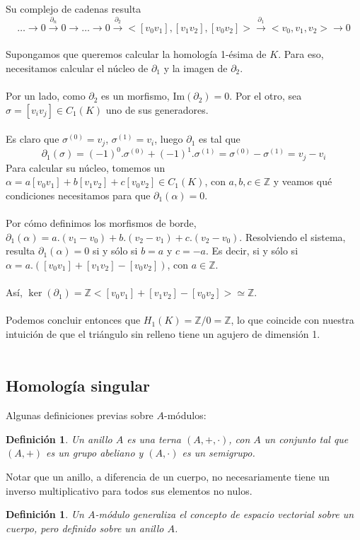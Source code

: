 \documentclass[12pt,a4paper]{article}
\newtheorem{definition}[theorem]{Definición}
\begin{document}
Su complejo de cadenas resulta
\[
    \ldots \rightarrow 0 \xrightarrow{\partial_n} 0 \rightarrow \ldots \rightarrow 0 \xrightarrow{\partial_2} <[v_0 v_1], [v_1v_2], [v_0v_2]> \xrightarrow{\partial_1} <v_0, v_1, v_2> \rightarrow 0
\]
\\
Supongamos que queremos calcular la homología 1-ésima de $K$. Para eso, necesitamos calcular el núcleo de $\partial_1$ y la imagen de $\partial_2$.
\\
\\
Por un lado, como $\partial_2$ es un morfismo, $\text{Im}(\partial_2) = 0$. Por el otro, sea $\sigma = [v_iv_j] \in C_1(K)$ uno de sus generadores.
\\
\\
Es claro que $\sigma^{(0)} = v_j$, $\sigma^{(1)} = v_i$, luego $\partial_1$ es tal que
\[
\partial_1(\sigma) = (-1)^0.\sigma^{(0)} + (-1)^1.\sigma^{(1)} = \sigma^{(0)} - \sigma^{(1)} = v_j - v_i
\]
Para calcular su núcleo, tomemos un $\alpha = a[v_0v_1] + b[v_1v_2] + c[v_0v_2] \in C_1(K)$, con $a, b, c \in \mathbb{Z}$ y veamos qué condiciones necesitamos para que $\partial_1(\alpha) = 0$.
\\
\\
Por cómo definimos los morfismos de borde, $\partial_1(\alpha) = a.(v_1-v_0) + b.(v_2-v_1) + c.(v_2-v_0)$. Resolviendo el sistema, resulta $\partial_1(\alpha)=0$ si y sólo si $b = a$ y $c = -a$. Es decir, si y sólo si $\alpha = a.([v_0v_1] + [v_1v_2] - [v_0v_2])$, con $a \in \mathbb{Z}$.
\\
\\
Así, $\ker(\partial_1)=\mathbb{Z}<[v_0v_1] + [v_1v_2] - [v_0v_2]> \simeq \mathbb{Z}$.
\\
\\
Podemos concluir entonces que $H_1(K) = \mathbb{Z} / 0 = \mathbb{Z}$, lo que coincide con nuestra intuición de que el triángulo sin relleno tiene un agujero de dimensión 1.
\\
\\
\subsection{Homología singular}
Algunas definiciones previas sobre $A$-módulos:
\begin{definition}    
Un \textit{anillo} $A$ es una terna $(A, +, \cdot)$, con $A$ un conjunto tal que $(A, +)$ es un grupo abeliano y $(A, \cdot)$ es un semigrupo.
\end{definition}
Notar que un anillo, a diferencia de un cuerpo, no necesariamente tiene un inverso multiplicativo para todos sus elementos no nulos.
\begin{definition}    
Un \textit{$A$-módulo} generaliza el concepto de espacio vectorial sobre un cuerpo, pero definido sobre un anillo $A$.
\end{definition}
\medskip
\end{document}
